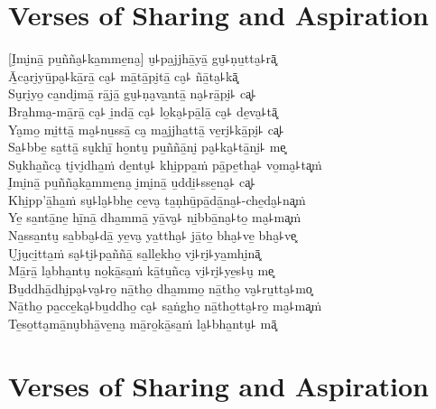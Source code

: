 \chapter*[Sharing and Aspiration]{Verses of Sharing and Aspiration}


\delegateSetUseNext

\begin{leader}
\end{leader}

[I̮mi̮nā̱ pu̱ñña̮꜕ka̱mme̱na̮] u̮꜕pa̱jjhā̱yā̱ gu̮꜕ṇu̱tta̮꜕rā͓\\
Ā̱ca̮ri̮yū̱pa̮꜕kā̱rā̱ ca̮꜕ mā̱tā̱pi̮tā̱ ca̮꜕ ñā̱ta̮꜕kā͓\\
Su̮ri̮yo̱ ca̱ndi̮mā̱ rā̱jā̱ gu̮꜕ṇa̮va̱ntā̱ na̮꜕rā̱pi̮꜕ ca͓꜕\\
Bra̱hma̮-mā̱rā̱ ca̮꜕ i̱ndā̱ ca̮꜕ lo̱ka̮꜕pā̱lā̱ ca̮꜕ de̱va̮꜕tā͓\\
Ya̮mo̱ mi̱ttā̱ ma̮꜕nu̱ssā̱ ca̮ ma̱jjha̱ttā̱ ve̱ri̮꜕kā̱pi̮꜕ ca͓꜕\\
Sa̱꜕bbe̱ sa̱ttā̱ su̮khī̱ ho̱ntu̮ pu̱ññā̱ni̮ pa̮꜕ka̮꜕tā̱ni̮꜕ me͓\\
Su̮kha̱ñca̮ ti̮vi̮dha̱ṁ de̱ntu̮꜕ khi̱ppa̱ṁ pā̱pe̱tha̮꜕ vo̱ma̮꜕ta͓ṁ\\
I̮mi̮nā̱ pu̱ñña̮ka̱mme̱na̮ i̮mi̮nā̱ u̱ddi̱꜕sse̱na̮꜕ ca͓꜕\\
Khi̱pp'ā̱ha̱ṁ su̮꜕la̮꜕bhe̱ ce̱va̮ ta̱ṇhū̱pā̱dā̱na̮꜕-che̱da̮꜕na͓ṁ\\
Ye̱ sa̱ntā̱ne̱ hī̱nā̱ dha̱mmā̱ yā̱va̮꜕ ni̱bbā̱na̮꜕to̱ ma̮꜕ma͓ṁ\\
Na̱ssa̱ntu̮ sa̱bba̮꜕dā̱ ye̱va̮ ya̱ttha̮꜕ jā̱to̱ bha̮꜕ve̱ bha̮꜕ve͓\\
U̮ju̮ci̱tta̱ṁ sa̮꜕ti̮꜕pa̱ññā̱ sa̱lle̱kho̱ vi̮꜕ri̮꜕ya̱mhi̮nā͓\\
Mā̱rā̱ la̮bha̱ntu̮ no̱kā̱sa̱ṁ kā̱tu̱ñca̮ vi̮꜕ri̮꜕ye̱s꜕u̮ me͓\\
Bu̱ddhā̱dhi̮pa̮꜕va̮꜕ro̱ nā̱tho̱ dha̱mmo̱ nā̱tho̱ va̮꜕ru̱tta̮꜕mo͓\\
Nā̱tho̱ pa̱cce̱ka̮꜕bu̱ddho̱ ca̮꜕ sa̱ṅgho̱ nā̱tho̱tta̮꜕ro̱ ma̮꜕ma͓ṁ\\
Te̱so̱tta̮mā̱nu̮bhā̱ve̱na̮ mā̱ro̱kā̱sa̱ṁ la̮꜕bha̱ntu̮꜕ mā͓

\chapter[Sharing and Aspiration]{Verses of Sharing and Aspiration}

